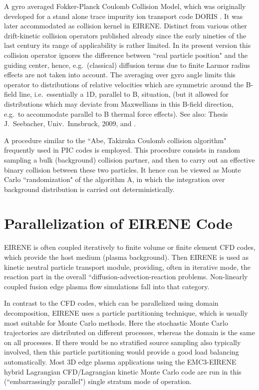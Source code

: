  A gyro averaged Fokker-Planck Coulomb Collision Model, which was
originally developed for a stand alone trace impurity ion transport code DORIS
\cite{kn:Doris,kn:Reiser98}.
It was later accommodated as collision kernel in EIRENE.
Distinct from various other drift-kinetic collision operators published already
since the early nineties of the last century its range of applicability is
rather limited.
In its present version this collision operator ignores the difference between
``real particle position" and the guiding center, hence, e.g.\ (classical)
diffusion terms due to finite Larmor radius effects are not taken into account.
The averaging over gyro angle limits this operator to distributions of relative
velocities which are symmetric around the B-field line, i.e.\ essentially a 1D,
parallel to B, situation, (but it allowed for distributions which may deviate
from Maxwellians in this B-field direction, e.g.\ to accommodate parallel to B
thermal force effects).
See also: Thesis J.~Seebacher, Univ.\ Innsbruck, 2009, and \cite{kn:Seebacher}.

A procedure similar to the ``Abe, Takizuka Coulomb collision algorithm"
frequently used in PIC codes \cite{kn:Takizuka} is employed.
This procedure consists in random sampling  a bulk (background) collision
partner, and then to carry out an effective binary collision between these two
particles.
It hence can be viewed as Monte Carlo ``randomization" of the algorithm A, in
which the integration over background distribution is carried out
deterministically.

\newpage

\section{Parallelization of EIRENE Code}

EIRENE is often coupled iteratively to finite volume or finite element \ac{CFD}
codes, which provide the host medium (plasma background).
Then EIRENE is used as kinetic neutral particle transport module, providing,
often in iterative mode, the reaction part in the overall
``diffusion-advection-reaction problems.
Non-linearly coupled fusion edge plasma flow simulations fall into that
category.

In contrast to the \ac{CFD} codes, which can be parallelized using domain
decomposition, EIRENE uses a particle partitioning technique, which is usually
most suitable for Monte Carlo methods.
Here the stochastic Monte Carlo trajectories are distributed on different
processes, whereas the domain is the same on all processes.
If there would be no stratified source sampling also typically involved, then
this particle partitioning would provide a good load balancing automatically.
Most 3D edge plasma applications using the EMC3-EIRENE hybrid Lagrangian
\acs{CFD}/Lagrangian kinetic Monte Carlo code are run in this (``embarrassingly
parallel") single stratum mode of operation.

